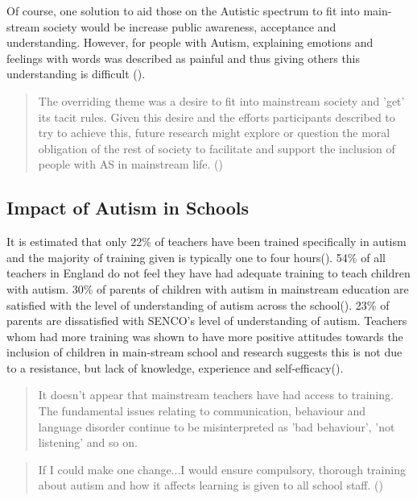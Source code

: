 \documentclass[11pt]{report}
\begin{document}
Of course, one solution to aid those on the Autistic spectrum to fit into main-stream society would be increase public awareness, acceptance and understanding. However, for people with Autism, explaining emotions and feelings with words was described as painful and thus giving others this understanding is difficult (\cite{aspieway}). 

\begin{quote}
The overriding theme was a desire to fit into mainstream society and 'get' its tacit rules. Given this desire and the
efforts participants described to try to achieve this, future research might explore or question the moral obligation of the rest of society to facilitate and support the inclusion of people with AS in mainstream life. (\cite{aspieway})
\end{quote}

\subsection{Impact of Autism in Schools}
It is estimated that only 22\% of teachers have been trained specifically in autism and the majority of training given is typically one to four hours(\cite{nasschool}). 54\% of all teachers in England do not feel they have had adequate training to teach children with autism.\cite{statsandfacts} 30\% of parents of children with autism in mainstream education are satisfied with the level of understanding of autism across the school(\cite{nasschool}). 23\% of parents are dissatisfied with SENCO's level of understanding of autism. Teachers whom had more training was shown to have more positive attitudes towards the inclusion of children in main-stream school and research suggests this is not due to a resistance, but lack of knowledge, experience and self-efficacy(\cite{teachersinclusion}).

\begin{quote}
It doesn't appear that mainstream teachers have had access to training. The fundamental issues relating to communication, behaviour and language disorder continue to be misinterpreted as 'bad behaviour', 'not listening' and so on.\cite{nasschool}
\end{quote}

\begin{quote}
If I could make one change...I would ensure compulsory, thorough training about autism and how it affects learning is given to all school staff. (\cite{nasschool})
\end{quote}
\end{document}
